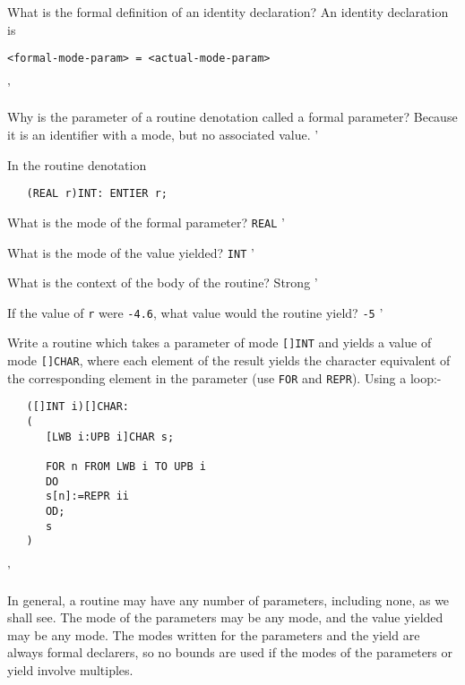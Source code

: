 \begin{exercise}
\item What is the formal definition of an identity declaration?
\ans An identity declaration is
\begin{verbatim}
<formal-mode-param> = <actual-mode-param>
\end{verbatim}
'
\item Why is the parameter of a routine denotation called a formal
parameter? \ans Because it is an identifier with a mode, but no
associated value.
'
\item In the routine denotation
\begin{verbatim}
   (REAL r)INT: ENTIER r;
\end{verbatim}
\indent\begin{subex}
\item What is the mode of the formal parameter? \subans \verb|REAL|
'
\item What is the mode of the value yielded? \subans \verb|INT|
'
\item What is the context of the body of the routine? \subans Strong
'
\item If the value of \verb|r| were \verb|-4.6|, what value
would the routine yield? \subans \verb|-5|
'
\end{subex}
\item Write a routine which takes a parameter of mode \verb|[]INT| and
yields a value of mode \verb|[]CHAR|, where each element of the result
yields the character equivalent of the corresponding element in the
parameter (use \verb|FOR| and \verb|REPR|). \ans Using a loop:-
\begin{verbatim}
   ([]INT i)[]CHAR:
   (
      [LWB i:UPB i]CHAR s;

      FOR n FROM LWB i TO UPB i
      DO
      s[n]:=REPR ii
      OD;
      s
   )
\end{verbatim}
'
\end{exercise}

In general, a routine may have any number of parameters, including
none, as we shall see. The mode of the parameters may be any mode,
and the value yielded may be any mode. The modes written for the
parameters and the yield are always formal declarers, so no bounds
are used if the modes of the parameters or yield involve multiples.

